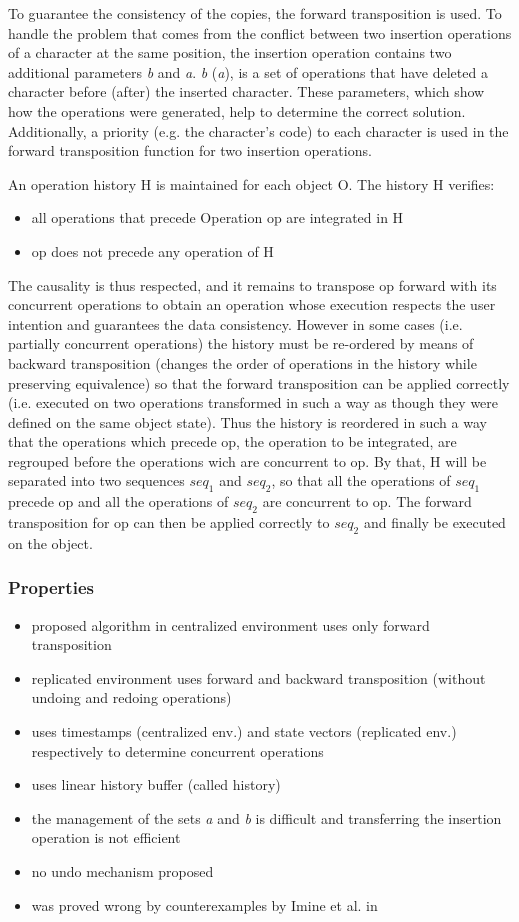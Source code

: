 To guarantee the consistency of the copies, the forward transposition is used. To handle the problem that comes from the conflict between two insertion operations of a character at the same position, the insertion operation contains two additional parameters \emph{b} and \emph{a}. \emph{b} (\emph{a}), is a set of operations that have deleted a character before (after) the inserted character. These parameters, which show how the operations were generated, help to determine the correct solution. Additionally, a priority (e.g. the character's code) to each character is used in the forward transposition function for two insertion operations.

An operation history H is maintained for each object O. The history H verifies:
\begin{itemize}
 \item all operations that precede Operation op are integrated in H
 \item op does not precede any operation of H
\end{itemize}
The causality is thus respected, and it remains to transpose op forward with its concurrent operations to obtain an operation whose execution respects the user intention and guarantees the data consistency. However in some cases (i.e. partially concurrent operations) the history must be re-ordered by means of backward transposition (changes the order of operations in the history while preserving equivalence) so that the forward transposition can be applied correctly (i.e. executed on two operations transformed in such a way as though they were defined on the same object state). Thus the history is reordered in such a way that the operations which precede op, the operation to be integrated, are regrouped before the operations wich are concurrent to op. By that, H will be separated into two sequences $seq_1$ and $seq_2$, so that all the operations of $seq_1$ precede op and all the operations of $seq_2$ are concurrent to op. The forward transposition for op can then be applied correctly to $seq_2$ and finally be executed on the object.

\subsubsection{Properties}
\begin{itemize}
 \item proposed algorithm in centralized environment uses only forward transposition
 \item replicated environment uses forward and backward transposition (without undoing and redoing operations)
 \item uses timestamps (centralized env.) and state vectors (replicated env.) respectively to determine concurrent operations
 \item uses linear history buffer (called history) 
 \item the management of the sets \emph{a} and \emph{b} is difficult and transferring the insertion operation is not efficient
 \item no undo mechanism proposed
 \item was proved wrong by counterexamples by Imine et al. in \cite{imine04}
\end{itemize}
